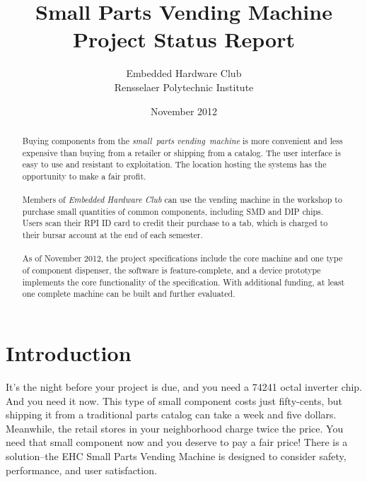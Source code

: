 \documentclass[12pt,draft,oneside]{article}
\title{Small Parts Vending Machine\\ Project Status Report}
\author{Embedded Hardware Club\\ Rensselaer Polytechnic Institute}
\date{November 2012}
\begin{document}
\maketitle
\thispagestyle{empty}
\begin{abstract}
  \noindent
  Buying components from the \emph{small~parts vending~machine} is more convenient and less expensive than buying from a retailer or shipping from a catalog. The user interface is easy to use and resistant to exploitation. The location hosting the systems has the opportunity to make a fair profit.
  \\~\\
  \small
  Members of \emph{Embedded Hardware Club} can use the vending machine in the workshop to purchase small quantities of common components, including SMD and DIP chips. Users scan their RPI ID card to credit their purchase to a tab, which is charged to their bursar account at the end of each semester.
  \\~\\
  As of November 2012, the project specifications include the core machine and one type of component dispenser, the software is feature-complete, and a device prototype implements the core functionality of the specification. With additional funding, at least one complete machine can be built and further evaluated.
\end{abstract}
\pagebreak


\thispagestyle{empty}
\tableofcontents
\vfill
\pagebreak


\section{Introduction}
\label{sec:intro}

It's the night before your project is due, and you need a \textsc{74241} octal inverter chip. And you need it now. This type of small component costs just fifty-cents, but shipping it from a traditional parts catalog can take a week and five dollars. Meanwhile, the retail stores in your neighborhood charge twice the price. You need that small component now and you deserve to pay a fair price! There is a solution--the EHC Small Parts Vending Machine is designed to consider safety, performance, and user satisfaction.
\end{document}
